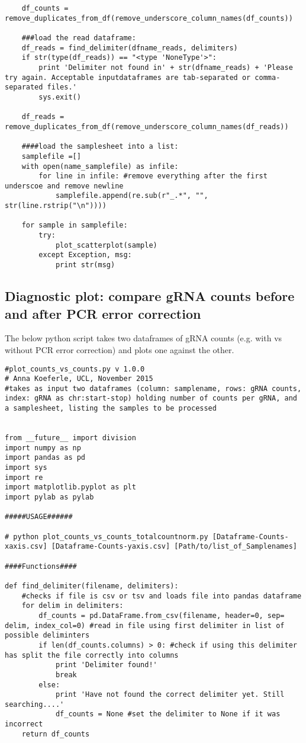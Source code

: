 \begin{footnotesize}
\begin{lstlisting}
    df_counts = remove_duplicates_from_df(remove_underscore_column_names(df_counts))

    ###load the read dataframe:
    df_reads = find_delimiter(dfname_reads, delimiters)
    if str(type(df_reads)) == "<type 'NoneType'>":
        print 'Delimiter not found in' + str(dfname_reads) + 'Please try again. Acceptable inputdataframes are tab-separated or comma-separated files.'
        sys.exit()

    df_reads = remove_duplicates_from_df(remove_underscore_column_names(df_reads))

    ####load the samplesheet into a list:
    samplefile =[]
    with open(name_samplefile) as infile:
        for line in infile: #remove everything after the first underscoe and remove newline
            samplefile.append(re.sub(r"_.*", "", str(line.rstrip("\n"))))

    for sample in samplefile:
        try:
            plot_scatterplot(sample)
        except Exception, msg:
            print str(msg)

\end{lstlisting}

\subsection{Diagnostic plot: compare gRNA counts before and after PCR error correction}

The below python script takes two dataframes of gRNA counts (e.g. with vs without PCR error correction) and plots one against the other.

\begin{lstlisting}
#plot_counts_vs_counts.py v 1.0.0
# Anna Koeferle, UCL, November 2015
#takes as input two dataframes (column: samplename, rows: gRNA counts, index: gRNA as chr:start-stop) holding number of counts per gRNA, and a samplesheet, listing the samples to be processed


from __future__ import division
import numpy as np
import pandas as pd
import sys
import re
import matplotlib.pyplot as plt
import pylab as pylab

#####USAGE######

# python plot_counts_vs_counts_totalcountnorm.py [Dataframe-Counts-xaxis.csv] [Dataframe-Counts-yaxis.csv] [Path/to/list_of_Samplenames]

####Functions####

def find_delimiter(filename, delimiters):
    #checks if file is csv or tsv and loads file into pandas dataframe
    for delim in delimiters:
        df_counts = pd.DataFrame.from_csv(filename, header=0, sep= delim, index_col=0) #read in file using first delimiter in list of possible deliminters
        if len(df_counts.columns) > 0: #check if using this delimiter has split the file correctly into columns
            print 'Delimiter found!'
            break
        else:
            print 'Have not found the correct delimiter yet. Still searching....'
            df_counts = None #set the delimiter to None if it was incorrect
    return df_counts


\end{lstlisting}
\end{footnotesize}
